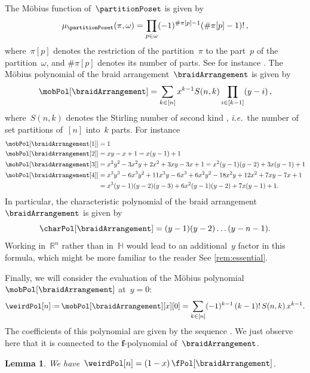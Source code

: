 \documentclass{amsart}
\newtheorem{lemma}[theorem]{Lemma}
\theoremstyle{definition}
\newcommand{\R}{\mathbb{R}} %
\renewcommand{\b}[1]{{\boldsymbol{#1}}} %
\newcommand{\eqdef}{\mbox{\,\raisebox{0.2ex}{\scriptsize\ensuremath{\mathrm:}}\ensuremath{=}\,}} %
\newcommand{\ie}{\textit{i.e.}~} %
\newcommand{\OEIS}[1]{\cite[{\rm \href{http://oeis.org/#1}{\texttt{#1}}}]{OEIS}}
\renewcommand{\b}[1]{\boldsymbol{#1}} %
\newcommand{\HH}{\mathbb{H}} %
\begin{document}
The M\"obius function of~$\partitionPoset$ is given by
\[
\mu_{\partitionPoset}(\pi, \omega) = \prod_{p \in \omega} (-1)^{\#\pi[p]-1}(\#\pi[p]-1)! \, ,
\]
where~$\pi[p]$ denotes the restriction of the partition~$\pi$ to the part~$p$ of the partition~$\omega$, and $\#\pi[p]$ denotes its number of parts.
See for instance \cite{Birkhoff, Rota}.
The M\"obius polynomial of the braid arrangement~$\braidArrangement$ is given by
\[
\mobPol[\braidArrangement] = \sum_{k \in [n]} x^{k-1} S(n,k) \prod_{i \in [k-1]} (y-i) \, ,
\]
where~$S(n,k)$ denotes the Stirling number of second kind \OEIS{A008277}, \ie the number of set partitions of~$[n]$ into~$k$ parts.
For instance
\begin{align*}
\mobPol[{\braidArrangement[1]}] & = 1 \\
\mobPol[{\braidArrangement[2]}] & = x y - x + 1 = x (y - 1) + 1 \\
\mobPol[{\braidArrangement[3]}] & = x^2 y^2 - 3 x^2 y + 2 x^2 + 3 x y - 3 x + 1 = x^2 (y - 1) (y - 2) + 3 x (y - 1) + 1\\
\mobPol[{\braidArrangement[4]}] & = x^3 y^3 - 6 x^3 y^2 + 11 x^3 y - 6 x^3 + 6 x^2 y^2 - 18 x^2 y + 12 x^2 + 7 x y - 7 x + 1 \\
& = x^3 (y - 1) (y - 2) (y - 3) + 6 x^2 (y - 1) (y - 2) + 7 x (y - 1) + 1.
\end{align*}
In particular, the characteristic polynomial of the braid arrangement~$\braidArrangement$ is given by
\[
\charPol[\braidArrangement] = (y-1) (y-2) \dots (y-n-1).
\]
Working in~$\R^n$ rather than in~$\HH$ would lead to an additional~$y$ factor in this formula, which might be more familiar to the reader
See \cref{rem:essential}.

Finally, we will consider the evaluation of the M\"obius polynomial~$\mobPol[\braidArrangement]$ at~$y = 0$:
\[
\weirdPol[n] \eqdef \mobPol[\braidArrangement][x][0] = \sum_{k \in [n]} (-1)^{k-1} \, (k-1)! \, S(n,k) \, x^{k-1}.
\] 
The coefficients of this polynomial are given by the sequence \OEIS{A028246}.
We just observe here that it is connected to the $\b{f}$-polynomial of~$\braidArrangement$.

\begin{lemma}
We have~$\weirdPol[n] = (1-x) \, \fPol[\braidArrangement]$.
\end{lemma}
\end{document}
